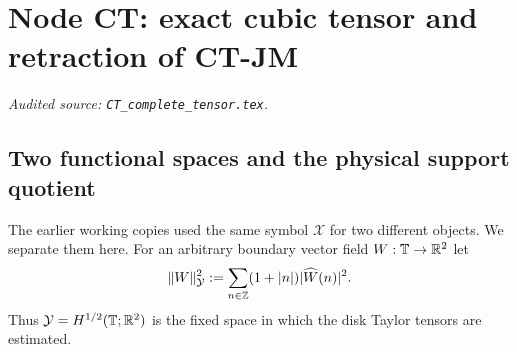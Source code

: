 \begingroup
\renewcommand{\Rone}{\mathcal R_1}
\section{Node CT: exact cubic tensor and retraction of CT-JM}
\label{module:CT}
\noindent\textit{Audited source: \nolinkurl{CT_complete_tensor.tex}.}
\subsection{Two functional spaces and the physical support quotient}
\label{CT:sec:functional-spaces}

The earlier working copies used the same symbol $\mathcal X$ for two
different objects.  We separate them here.  For an arbitrary boundary
vector field $W:\mathbb T\to\mathbb R^2$ let
\begin{equation}\label{CT:eq:Y-norm}
 \|W\|_{\mathcal Y}^{2}
 :=\sum_{n\in\mathbb Z}(1+|n|)|\widehat W(n)|^2.
\end{equation}
Thus $\mathcal Y=H^{1/2}(\mathbb T;\mathbb R^2)$ is the fixed space in which the disk
Taylor tensors are estimated.

